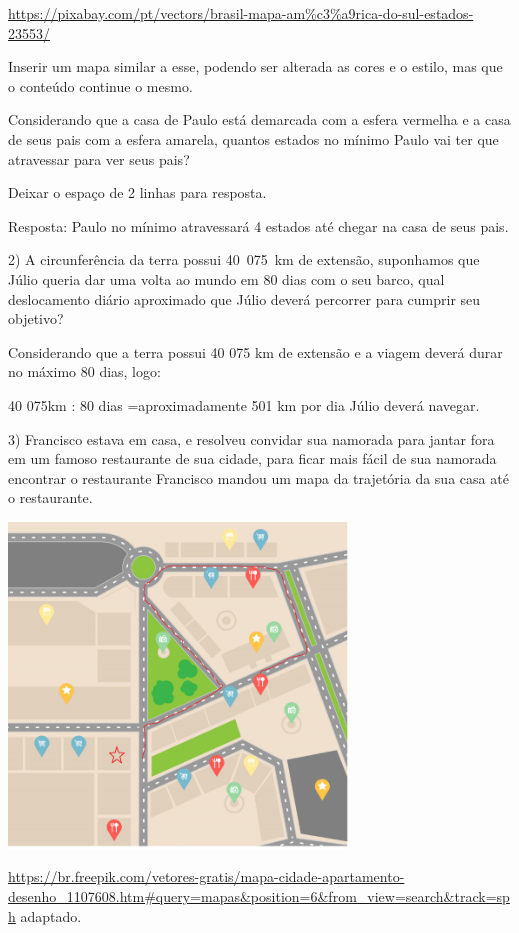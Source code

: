 {\url{https://pixabay.com/pt/vectors/brasil-mapa-am\%c3\%a9rica-do-sul-estados-23553/}

Inserir um mapa similar a esse, podendo ser alterada as cores e o
estilo, mas que o conteúdo continue o mesmo.

Considerando que a casa de Paulo está demarcada com a esfera vermelha e
a casa de seus pais com a esfera amarela, quantos estados no mínimo
Paulo vai ter que atravessar para ver seus pais?

Deixar o espaço de 2 linhas para resposta.

Resposta: Paulo no mínimo atravessará 4 estados até chegar na casa de
seus pais.

2) A circunferência da terra possui 40~075~km de extensão, suponhamos
que Júlio queria dar uma volta ao mundo em 80 dias com o seu barco, qual
deslocamento diário aproximado que Júlio deverá percorrer para cumprir
seu objetivo?

Considerando que a terra possui 40 075 km de extensão e a viagem deverá
durar no máximo 80 dias, logo:

40 075km : 80 dias =aproximadamente 501 km por dia Júlio deverá navegar.

3) Francisco estava em casa, e resolveu convidar sua namorada para
jantar fora em um famoso restaurante de sua cidade, para ficar mais
fácil de sua namorada encontrar o restaurante Francisco mandou um mapa
da trajetória da sua casa até o restaurante.

\includegraphics[width=3.55in,height=3.406in]{./imgSAEB_8_MAT/media/image37.png}

\url{https://br.freepik.com/vetores-gratis/mapa-cidade-apartamento-desenho_1107608.htm\#query=mapas\&position=6\&from_view=search\&track=sph}
adaptado.

}
